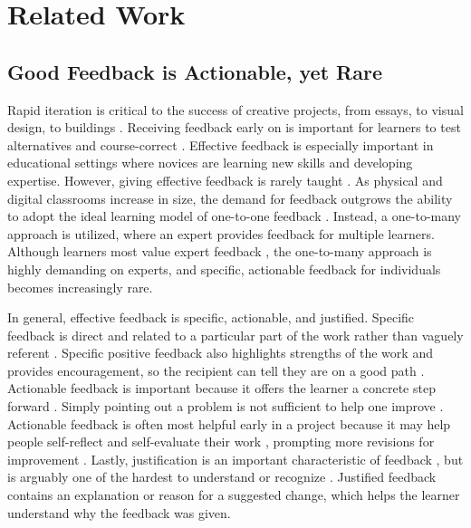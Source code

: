 \section{Related Work}
\subsection{Good Feedback is Actionable, yet Rare}
Rapid iteration is critical to the success of creative projects, from essays, to visual design, to buildings \cite{Dow2010, Sadler1989}. Receiving feedback early on is important for learners to test alternatives and course-correct \cite{Dow2010, Tohidi2006}. Effective feedback is especially important in educational settings where novices are learning new skills and developing expertise. However, giving effective feedback is rarely taught \cite{Nicol2006}. As physical and digital classrooms increase in size, the demand for feedback outgrows the ability to adopt the ideal learning model of one-to-one feedback \cite{Bloom1984}. Instead, a one-to-many approach is utilized, where an expert provides feedback for multiple learners. Although learners most value expert feedback \cite{Gielen2010, Yang2006}, the one-to-many approach is highly demanding on experts, and specific, actionable feedback for individuals becomes increasingly rare. 

In general, effective feedback is specific, actionable, and justified. Specific feedback is direct and related to a particular part of the work rather than vaguely referent \cite{Krause2017, Sadler1989, Yuan2016}. Specific positive feedback also highlights strengths of the work and provides encouragement, so the recipient can tell they are on a good path \cite{Kelley2013, Tseng2007, Yuan2016}. Actionable feedback is important because it offers the learner a concrete step forward \cite{Sadler1989, Sommers1982, Tseng2007, Yuan2016}. Simply pointing out a problem is not sufficient to help one improve \cite{Ramaprasad1983, Sadler1989, Sommers1982, Tohidi2006}. Actionable feedback is often most helpful early in a project \cite{Cho2006, Tseng2007, Yuan2016} because it may help people self-reflect and self-evaluate their work \cite{Gibbs}, prompting more revisions for improvement \cite{Dow2012, Topping1998}. Lastly, justification is an important characteristic of feedback \cite{Krause2017, Narciss2006, Yuan2016}, but is arguably one of the hardest to understand or recognize \cite{Gielen2010}. Justified feedback contains an explanation or reason for a suggested change, which helps the learner understand why the feedback was given.

